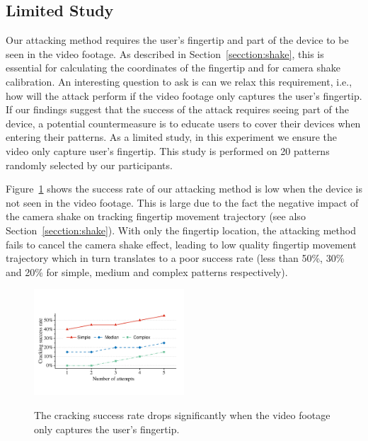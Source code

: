 \subsection{Limited Study}
\label{section: limited-study}

Our attacking method requires the user's fingertip and part of the device to be seen in the video footage.  As
described in Section~\ref{secction:shake}, this is essential for calculating the coordinates of the fingertip and for
camera shake calibration. An interesting question to ask is can we relax this requirement, i.e., how will the attack
perform if the video footage only captures the user's fingertip. If our findings
suggest that the success of the attack requires seeing part of the device, a potential countermeasure is to educate users to cover their devices when entering their patterns.
As a limited study, in this experiment we ensure the video only capture user's fingertip. This study is performed on 20 patterns randomly selected by our participants.

Figure~\ref{fig:finger-only} shows the success rate of our attacking method is low when the device is not seen in the video footage.
This is large due to the fact the negative impact of the camera shake on tracking fingertip movement trajectory (see also Section~\ref{secction:shake}).
With only the fingertip location, the attacking method fails to cancel the camera shake effect, leading to low quality fingertip movement trajectory
which in turn translates to a poor success rate (less than 50\%, 30\% and 20\% for simple, medium and complex patterns respectively).

    \begin{figure}[!t]
        \centering
        \includegraphics[width=0.5\textwidth]{fig/finger-only}\\
        \caption{The cracking success rate drops significantly when the video footage only captures the user's fingertip.}
        \label{fig:finger-only}
    \end{figure}

